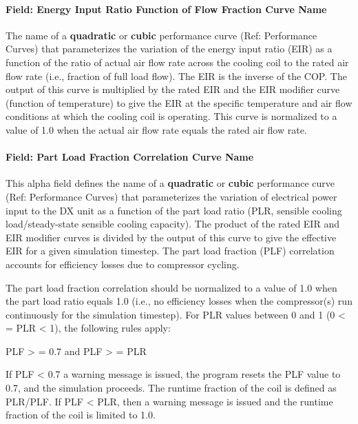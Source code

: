 \paragraph{Field: Energy Input Ratio Function of Flow Fraction Curve Name}\label{field-energy-input-ratio-function-of-flow-fraction-curve-name-2}

The name of a \textbf{quadratic} or \textbf{cubic} performance curve (Ref: Performance Curves) that parameterizes the variation of the energy input ratio (EIR) as a function of the ratio of actual air flow rate across the cooling coil to the rated air flow rate (i.e., fraction of full load flow). The EIR is the inverse of the COP. The output of this curve is multiplied by the rated EIR and the EIR modifier curve (function of temperature) to give the EIR at the specific temperature and air flow conditions at which the cooling coil is operating. This curve is normalized to a value of 1.0 when the actual air flow rate equals the rated air flow rate.

\paragraph{Field: Part Load Fraction Correlation Curve Name}\label{field-part-load-fraction-correlation-curve-name-5}

This alpha field defines the name of a \textbf{quadratic} or \textbf{cubic} performance curve (Ref: Performance Curves) that parameterizes the variation of electrical power input to the DX unit as a function of the part load ratio (PLR, sensible cooling load/steady-state sensible cooling capacity). The product of the rated EIR and EIR modifier curves is divided by the output of this curve to give the effective EIR for a given simulation timestep. The part load fraction (PLF) correlation accounts for efficiency losses due to compressor cycling.

The part load fraction correlation should be normalized to a value of 1.0 when the part load ratio equals 1.0 (i.e., no efficiency losses when the compressor(s) run continuously for the simulation timestep). For PLR values between 0 and 1 (0 \textless{} = PLR \textless{} 1), the following rules apply:

PLF \textgreater{} = 0.7 and PLF \textgreater{} = PLR

If PLF \textless{} 0.7 a warning message is issued, the program resets the PLF value to 0.7, and the simulation proceeds. The runtime fraction of the coil is defined as PLR/PLF. If PLF \textless{} PLR, then a warning message is issued and the runtime fraction of the coil is limited to 1.0.

